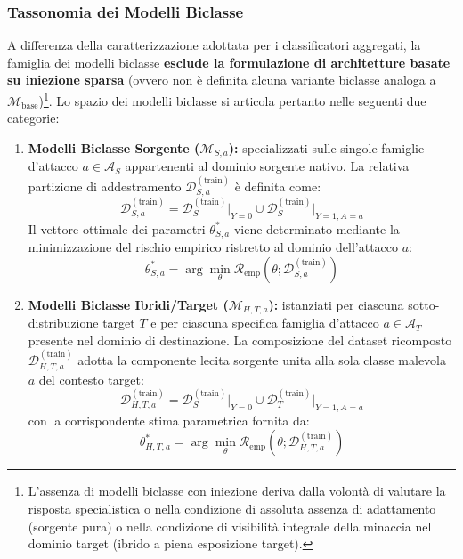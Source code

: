 \subsubsection{Tassonomia dei Modelli Biclasse}
\label{subsubsec:tassonomia_biclasse}
A differenza della caratterizzazione adottata per i classificatori aggregati, la famiglia dei modelli biclasse \textbf{esclude la formulazione di architetture basate su iniezione sparsa} (ovvero non è definita alcuna variante biclasse analoga a $\mathcal{M}_{\text{base}}$)\footnote{L'assenza di modelli biclasse con iniezione deriva dalla volontà di valutare la risposta specialistica o nella condizione di assoluta assenza di adattamento (sorgente pura) o nella condizione di visibilità integrale della minaccia nel dominio target (ibrido a piena esposizione target).}. Lo spazio dei modelli biclasse si articola pertanto nelle seguenti due categorie:
\begin{enumerate}
    \item \textbf{Modelli Biclasse Sorgente ($\mathcal{M}_{S, a}$):}
    specializzati sulle singole famiglie d'attacco $a \in \mathcal{A}_S$ appartenenti al dominio sorgente nativo. La relativa partizione di addestramento $\mathcal{D}_{S, a}^{(\text{train})}$ è definita come:
    \begin{equation}
        \mathcal{D}_{S, a}^{(\text{train})} = \mathcal{D}_{S}^{(\text{train})}\Big|_{Y=0} \cup \mathcal{D}_{S}^{(\text{train})}\Big|_{Y=1, A=a}
        \label{eq:ds_a_composition}
    \end{equation}
    Il vettore ottimale dei parametri $\theta_{S, a}^*$ viene determinato mediante la minimizzazione del rischio empirico ristretto al dominio dell'attacco $a$:
    \begin{equation}
        \theta_{S, a}^* = \arg\min_\theta \mathcal{R}_{\text{emp}}\left(\theta; \mathcal{D}_{S, a}^{(\text{train})}\right)
        \label{eq:ms_a_optimization}
    \end{equation}

    \item \textbf{Modelli Biclasse Ibridi/Target ($\mathcal{M}_{H, T, a}$):}
    istanziati per ciascuna sotto-distribuzione target $T$ e per ciascuna specifica famiglia d'attacco $a \in \mathcal{A}_T$ presente nel dominio di destinazione. La composizione del dataset ricomposto $\mathcal{D}_{H, T, a}^{(\text{train})}$ adotta la componente lecita sorgente unita alla sola classe malevola $a$ del contesto target:
    \begin{equation}
        \mathcal{D}_{H, T, a}^{(\text{train})} = \mathcal{D}_{S}^{(\text{train})}\Big|_{Y=0} \cup \mathcal{D}_{T}^{(\text{train})}\Big|_{Y=1, A=a}
        \label{eq:dh_a_composition}
    \end{equation}
    con la corrispondente stima parametrica fornita da:
    \begin{equation}
        \theta_{H, T, a}^* = \arg\min_\theta \mathcal{R}_{\text{emp}}\left(\theta; \mathcal{D}_{H, T, a}^{(\text{train})}\right)
        \label{eq:mh_a_optimization}
    \end{equation}
\end{enumerate}

